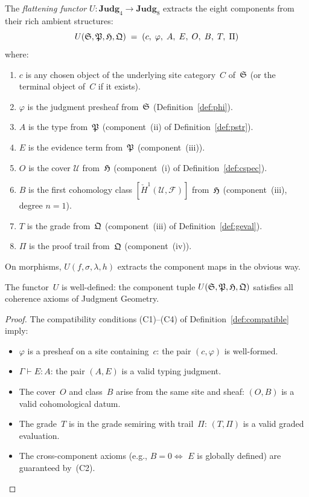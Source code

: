 \begin{construction}
\label{con:forgetful-functor}
The \emph{flattening functor}
$U : \mathbf{Judg}_4 \to \mathbf{Judg}_8$ extracts the eight
components from their rich ambient structures:
\[
  U(\mathfrak{S}, \mathfrak{P}, \mathfrak{H}, \mathfrak{Q})
  \;=\;
  (c,\; \varphi,\; A,\; E,\; O,\; B,\; T,\; \Pi)
\]
where:
\begin{enumerate}[label=(\roman*),nosep]
\item $c$ is any chosen object of the underlying site category~$C$
  of~$\mathfrak{S}$ (or the terminal object of~$C$ if it exists).
\item $\varphi$ is the judgment presheaf from~$\mathfrak{S}$
  (Definition~\ref{def:phi}).
\item $A$ is the type from~$\mathfrak{P}$ (component~(ii) of
  Definition~\ref{def:pstr}).
\item $E$ is the evidence term from~$\mathfrak{P}$ (component~(iii)).
\item $O$ is the cover $\mathcal{U}$ from~$\mathfrak{H}$
  (component~(i) of Definition~\ref{def:cspec}).
\item $B$ is the first cohomology class
  $[\check{H}^1(\mathcal{U}, \mathcal{F})]$ from~$\mathfrak{H}$
  (component~(iii), degree $n=1$).
\item $T$ is the grade from~$\mathfrak{Q}$
  (component~(iii) of Definition~\ref{def:geval}).
\item $\Pi$ is the proof trail from~$\mathfrak{Q}$ (component~(iv)).
\end{enumerate}
On morphisms, $U(f, \sigma, \lambda, h)$ extracts the component maps
in the obvious way.
\end{construction}

\begin{proposition}
\label{prop:U-well-defined}
The functor~$U$ is well-defined: the component tuple
$U(\mathfrak{S}, \mathfrak{P}, \mathfrak{H}, \mathfrak{Q})$ satisfies all coherence axioms of
Judgment Geometry.
\end{proposition}

\begin{proof}
The compatibility conditions (C1)--(C4) of
Definition~\ref{def:compatible} imply:
\begin{itemize}[nosep]
\item $\varphi$ is a presheaf on a site containing~$c$: the pair
  $(c, \varphi)$ is well-formed.
\item $\Gamma \vdash E : A$: the pair $(A, E)$ is a valid typing
  judgment.
\item The cover~$O$ and class~$B$ arise from the same site and
  sheaf: $(O, B)$ is a valid cohomological datum.
\item The grade~$T$ is in the grade semiring with trail~$\Pi$:
  $(T, \Pi)$ is a valid graded evaluation.
\item The cross-component axioms (e.g., $B = 0 \Leftrightarrow$
  $E$ is globally defined) are guaranteed by~(C2).
  \qedhere
\end{itemize}
\end{proof}

